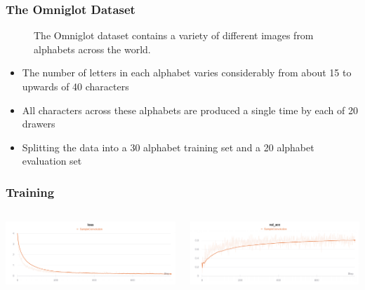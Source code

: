 \documentclass[xetex,mathserif,serif]{beamer}
\begin{document}
	\begin{frame}
		\frametitle{The Omniglot Dataset}
    		\begin{figure}[h]
                \caption{The Omniglot dataset contains a variety of different images from alphabets across the world.}
                \label{fig:image}
            \end{figure}
            
            \begin{itemize}
		 		\item The number of letters in each alphabet varies considerably from about 15 to upwards of 40 characters
		 		\item All characters across these alphabets are produced a single time by each of 20 drawers
		 		\item Splitting the data into a 30 alphabet training set and a 20 alphabet evaluation set
			\end{itemize}
	\end{frame}		
	
	\begin{frame}
		\frametitle{Training}
            \begin{columns}
                    \begin{minipage}[c][0.4\textheight][c]{\linewidth}
                        \centering
                        \includegraphics[width=0.7\linewidth]{images/loss.png}
                    \end{minipage}
            
                    \begin{minipage}[c][0.6\textheight][c]{\linewidth}
                        \centering
                        \includegraphics[width=0.7\linewidth]{images/val_acc.png}
                    \end{minipage}
            \end{columns}
	\end{frame}	
	
\end{document}
